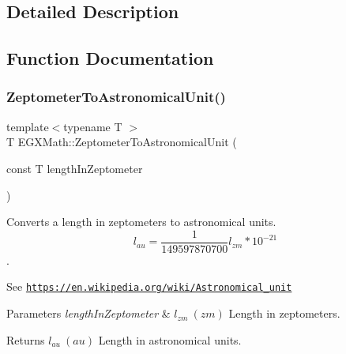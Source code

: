 \subsection{Detailed Description}


\subsection{Function Documentation}
\mbox{\label{group___e_g_x_math-_conversions-_length_conversions-_s_i-_zeptometer-_astronomical_ga01bceda59fbfc5414c72ccba254b365c}} 
\subsubsection{\texorpdfstring{Zeptometer\+To\+Astronomical\+Unit()}{ZeptometerToAstronomicalUnit()}}
{\footnotesize\ttfamily template$<$typename T $>$ \\
T E\+G\+X\+Math\+::\+Zeptometer\+To\+Astronomical\+Unit (\begin{DoxyParamCaption}\item[{const T}]{length\+In\+Zeptometer }\end{DoxyParamCaption})}



Converts a length in zeptometers to astronomical units. \[ l_{au}= \frac{1}{149597870700} l_{zm} * 10^{-21} \]. 

See \href{https://en.wikipedia.org/wiki/Astronomical_unit}{\tt https\+://en.\+wikipedia.\+org/wiki/\+Astronomical\+\_\+unit} 
\begin{DoxyParams}{Parameters}
{\em length\+In\+Zeptometer} & $ l_{zm}\ (zm)$ Length in zeptometers. \\
\hline
\end{DoxyParams}
\begin{DoxyReturn}{Returns}
$ l_{au}\ (au)$ Length in astronomical units. 
\end{DoxyReturn}
\mbox{\label{group___e_g_x_math-_conversions-_length_conversions-_s_i-_zeptometer-_astronomical_gaadccc6ef68b9d71b37be40ffbb845843}} 
